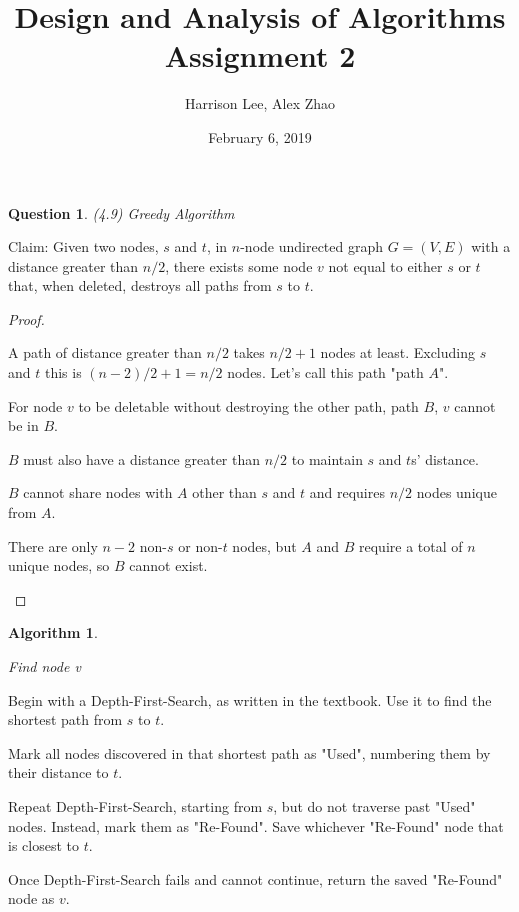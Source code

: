 \documentclass[11pt, oneside]{article}   	%
\title {Design and Analysis of Algorithms Assignment 2}
\author{Harrison Lee, Alex Zhao}
\date{February 6, 2019}
\newtheorem{Question}{Question}
\newtheorem{Algorithm}{Algorithm}
\begin{document}
\maketitle

\begin{Question} (4.9) Greedy Algorithm
\end{Question}

Claim: Given two nodes, $s$ and $t$, in $n$-node undirected graph $G = (V, E)$ with a distance greater than $n/2$, there exists some node $v$ not equal to either $s$ or $t$ that, when deleted, destroys all paths from $s$ to $t$.

\begin{proof}
\begin{description}

A path of distance greater than $n/2$ takes $n/2 + 1$ nodes at least. Excluding $s$ and $t$ this is $(n-2)/2 + 1= n/2$ nodes. Let's call this path "path $A$".

For node $v$ to be deletable without destroying the other path, path $B$, $v$ cannot be in $B$.

$B$ must also have a distance greater than $n/2$ to maintain $s$ and $t$s' distance.

$B$ cannot share nodes with $A$ other than $s$ and $t$ and requires $n/2$ nodes unique from $A$.

There are only $n-2$ non-$s$ or non-$t$ nodes, but $A$ and $B$ require a total of $n$ unique nodes, so $B$ cannot exist.

\end{description}
\end{proof}

\begin{Algorithm}
\begin{description}
Find node v
\end{description}
\end{Algorithm}

Begin with a Depth-First-Search, as written in the textbook. Use it to find the shortest path from $s$ to $t$.

Mark all nodes discovered in that shortest path as "Used", numbering them by their distance to $t$.

Repeat Depth-First-Search, starting from $s$, but do not traverse past "Used" nodes. Instead, mark them as "Re-Found". Save whichever "Re-Found" node that is closest to $t$.

Once Depth-First-Search fails and cannot continue, return the saved "Re-Found" node as $v$.
\end{document}
